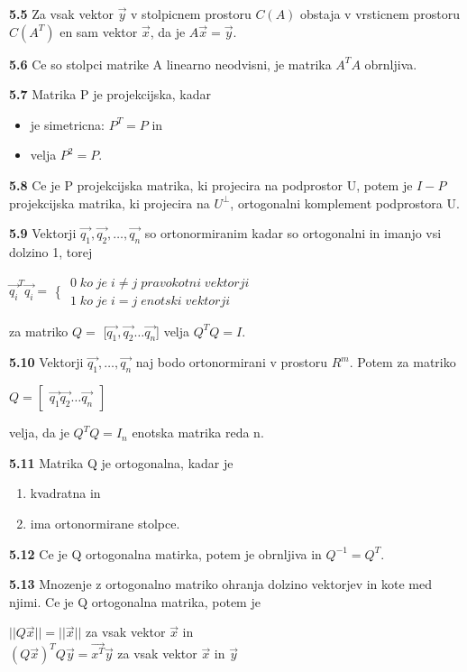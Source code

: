 \documentclass{article}
\begin{document}
\begin{multicols}{3}
\textbf{5.5} Za vsak vektor $\vec{y}$ v stolpicnem prostoru $C(A)$ obstaja v vrsticnem prostoru $C(A^{T})$ en sam
vektor $\vec{x}$, da je $A\vec{x} = \vec{y}$.

\textbf{5.6} Ce so stolpci matrike A linearno neodvisni, je matrika $A^{T}A$ obrnljiva.

\textbf{5.7} Matrika P je projekcijska, kadar
\begin{itemize}
    \item je simetricna: $P^{T} = P$ in
    \item velja $P^{2} = P$.
\end{itemize}

\textbf{5.8} Ce je P projekcijska matrika, ki projecira na podprostor U, potem je $I -P$ projekcijska
matrika, ki projecira na $U^{\perp}$, ortogonalni komplement podprostora U.

\textbf{5.9} Vektorji $\vec{q_{1}}, \vec{q_{2}}, \dots, \vec{q_{n}}$ so ortonormiranim kadar so ortogonalni in imanjo vsi
dolzino 1, torej
\begin{center}
    $\vec{q_{i}}^{T}\vec{q_{i}} = $ \Bigg\{ 
    $\begin{matrix}
        0\;  ko\; je\; i \neq j\; pravokotni\; vektorji\\
        1\;  ko\; je\; i = j\; enotski\; vektorji
    \end{matrix}$
\end{center}
za matriko $Q =$ [$\vec{q_{1}}, \vec{q_{2}} \dots \vec{q_{n}}$]  velja $Q^{T}Q = I$.

\textbf{5.10} Vektorji $\vec{q_{1}}, \dots, \vec{q_{n}}$ naj bodo ortonormirani v prostoru $R^{m}$. Potem
za matriko
\begin{center}
    $Q = \begin{bmatrix}
        \vec{q_{1}} \vec{q_{2}} \dots \vec{q_{n}}
    \end{bmatrix}$
\end{center}
velja, da je $Q^{T}Q = I_{n}$ enotska matrika reda n.

\textbf{5.11} Matrika Q je ortogonalna, kadar je
\begin{enumerate}
    \item kvadratna in
    \item ima ortonormirane stolpce.
\end{enumerate}

\textbf{5.12} Ce je Q ortogonalna matirka, potem je obrnljiva in $Q^{-1} = Q^{T}$.

\textbf{5.13} Mnozenje z ortogonalno matriko ohranja dolzino vektorjev in kote med njimi. Ce je Q
ortogonalna matrika, potem je 
\begin{center}
    $|| Q \vec{x} || = || \vec{x} ||$ za vsak vektor $\vec{x}$ in\\
    $(Q\vec{x})^{T}Q\vec{y} = \vec{x^{T}} \vec{y}$ za vsak vektor $\vec{x}$ in $\vec{y}$
\end{center}


\end{multicols}
\end{document}
